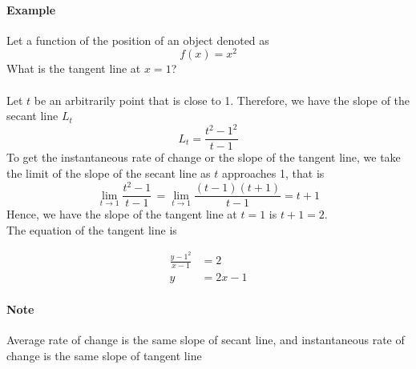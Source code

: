\documentclass[12pt]{article}
\begin{document}
\paragraph{Example} Let a function of the position of an object denoted as 
\[
    f(x) = x^2 
\]
What is the tangent line at $x = 1$? \\ \\
Let $t$ be an arbitrarily point that is close to 1. Therefore, we have the slope of the secant line $L_t$
\[
    L_t = \frac{t^2 - 1^2}{t - 1} 
\]
To get the instantaneous rate of change or the slope of the tangent line, we take the limit of the slope
of the secant line as $t$ approaches 1, that is
\[
    \lim_{t \to 1} \frac{t^2 - 1}{t - 1}\, = \lim_{t \to 1} \frac{(t - 1)(t + 1)}{t - 1} = t + 1
\]
Hence, we have the slope of the tangent line at $t=1$ is $t + 1 =  2$.\\
The equation of the tangent line is

\begin{align*}
    \frac{y - 1^2}{x - 1} &= 2 \\
    y &= 2x - 1
\end{align*}
\paragraph{Note}
Average rate of change is the same slope of secant line, and 
instantaneous rate of change is the same slope of tangent line
\end{document}
